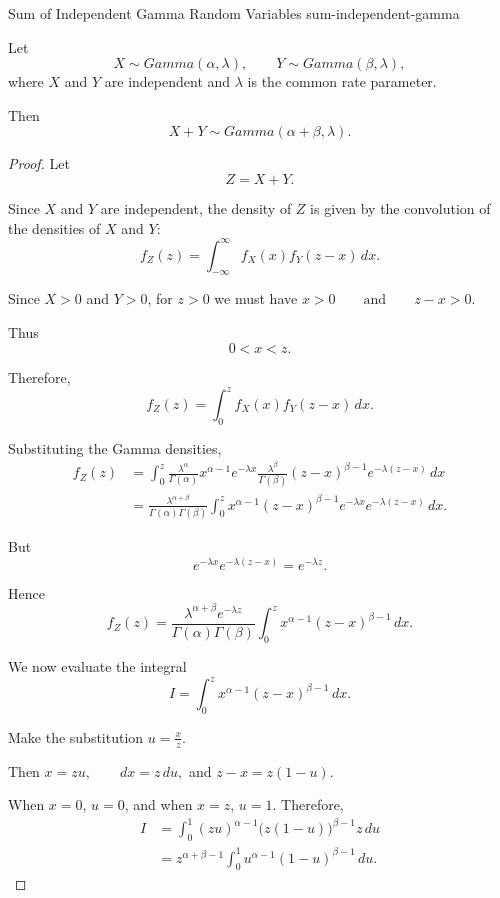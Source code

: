 
\begin{proposition}{Sum of Independent Gamma Random Variables}
{sum-independent-gamma}

Let
\[
X\sim Gamma(\alpha,\lambda),
\qquad
Y\sim Gamma(\beta,\lambda),
\]
where $X$ and $Y$ are independent and $\lambda$ is the common
rate parameter.

Then
\[
\boxed{
X+Y\sim Gamma(\alpha+\beta,\lambda).
}
\]

\end{proposition}

\begin{proof}

Let
\[
Z=X+Y.
\]

Since $X$ and $Y$ are independent, the density of $Z$ is given by
the convolution of the densities of $X$ and $Y$:
\[
f_Z(z)
=
\int_{-\infty}^{\infty}
f_X(x)f_Y(z-x)\,dx.
\]

Since $X>0$ and $Y>0$, for $z>0$ we must have
\(
x>0
\qquad\text{and}\qquad
z-x>0.
\)

Thus
\[
0<x<z.
\]

Therefore,
\[
f_Z(z)
=
\int_0^z
f_X(x)f_Y(z-x)\,dx.
\]

Substituting the Gamma densities,
\[
\begin{aligned}
f_Z(z)
&=
\int_0^z
\frac{\lambda^\alpha}{\Gamma(\alpha)}
x^{\alpha-1}e^{-\lambda x}
\frac{\lambda^\beta}{\Gamma(\beta)}
(z-x)^{\beta-1}e^{-\lambda(z-x)}
\,dx\\
&=
\frac{\lambda^{\alpha+\beta}}
{\Gamma(\alpha)\Gamma(\beta)}
\int_0^z
x^{\alpha-1}(z-x)^{\beta-1}
e^{-\lambda x}e^{-\lambda(z-x)}
\,dx.
\end{aligned}
\]

But
\[
e^{-\lambda x}e^{-\lambda(z-x)}
=
e^{-\lambda z}.
\]

Hence
\[
f_Z(z)
=
\frac{\lambda^{\alpha+\beta}e^{-\lambda z}}
{\Gamma(\alpha)\Gamma(\beta)}
\int_0^z
x^{\alpha-1}(z-x)^{\beta-1}\,dx.
\]

We now evaluate the integral
\[
I
=
\int_0^z
x^{\alpha-1}(z-x)^{\beta-1}\,dx.
\]

Make the substitution
\(
u=\frac{x}{z}.
\)

Then
\(
x=zu,
\qquad
dx=z\,du,
\)
and
\(
z-x=z(1-u).
\)

When $x=0$, $u=0$, and when $x=z$, $u=1$. Therefore,
\[
\begin{aligned}
I
&=
\int_0^1
(zu)^{\alpha-1}
\bigl(z(1-u)\bigr)^{\beta-1}
z\,du\\
&=
z^{\alpha+\beta-1}
\int_0^1
u^{\alpha-1}(1-u)^{\beta-1}\,du.
\end{aligned}
\]


\end{proof}
